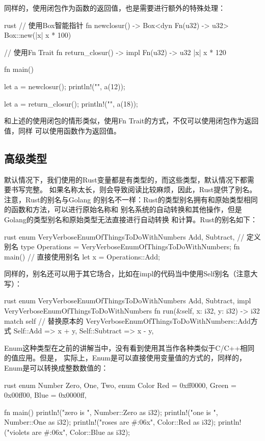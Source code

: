 同样的，使用闭包作为函数的返回值，也是需要进行额外的特殊处理：
\begin{code-block}{rust}
// 使用Box智能指针
fn newclosur() -> Box<dyn Fn(u32) -> u32> {
    Box::new(|x| x * 100)
}

// 使用Fn Trait
fn return_closur() -> impl Fn(u32) -> u32 {
    |x| x * 120
}

fn main() {
    let a = newclosur();
    println!("{}", a(12));

    let a = return_closur();
    println!("{}", a(18));
}
\end{code-block}
和上述的使用闭包的情形类似，使用Fn Trait的方式，不仅可以使用闭包作为返回值，同样
可以使用函数作为返回值。

\subsection{高级类型}
默认情况下，我们使用的Rust变量都是有类型的，而这些类型，默认情况下都需要书写完整。
如果名称太长，则会导致阅读比较麻烦，因此，Rust提供了别名。注意，Rust的别名与Golang
的别名不一样：Rust的类型别名拥有和原始类型相同的函数和方法，可以进行原始名称和
别名系统的自动转换和其他操作，但是Golang的类型别名和原始类型无法直接进行自动转换
和计算。Rust的别名如下：
\begin{code-block}{rust}
enum VeryVerboseEnumOfThingsToDoWithNumbers {
    Add,
    Subtract,
}
// 定义别名
type Operations = VeryVerboseEnumOfThingsToDoWithNumbers;
fn main() {
    // 直接使用别名
    let x = Operations::Add;
}
\end{code-block}
同样的，别名还可以用于其它场合，比如在impl的代码当中使用Self别名（注意大写）：
\begin{code-block}{rust}
enum VeryVerboseEnumOfThingsToDoWithNumbers {
    Add,
    Subtract,
}
impl VeryVerboseEnumOfThingsToDoWithNumbers {
    fn run(&self, x: i32, y: i32) -> i32 {
        match self {
            // 替换原本的 VeryVerboseEnumOfThingsToDoWithNumbers::Add方式
            Self::Add => x + y,
            Self::Subtract => x - y,
        }
    }
}
\end{code-block}

Enum这种类型在之前的讲解当中，没有看到使用其当作各种类似于C/C++相同的值应用。但是，
实际上，Enum是可以直接使用变量值的方式的，同样的，Enum是可以转换成整数数值的：
\begin{code-block}{rust}
enum Number {
    Zero,
    One,
    Two,
}
enum Color {
    Red = 0xff0000,
    Green = 0x00ff00,
    Blue = 0x0000ff,
}

fn main() {
    println!("zero is {}", Number::Zero as i32);
    println!("one is {}", Number::One as i32);
    println!("roses are #{:06x}", Color::Red as i32);
    println!("violets are #{:06x}", Color::Blue as i32);
}
\end{code-block}

